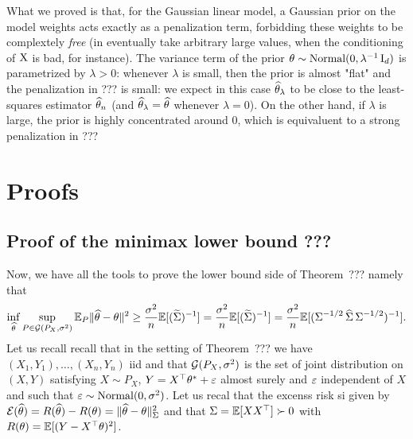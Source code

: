 What we proved is that, for the Gaussian linear model, a Gaussian prior on the model weights acts exactly as a penalization term, forbidding these weights to be complextely \emph{free} (in eventually take arbitrary large values, when the conditioning of $\operatorname{{\boldsymbol X}}$ is bad, for instance). The variance term of the prior $\theta \sim \operatorname{Normal}(0, \lambda^{-1} \operatorname{{\boldsymbol I}}_d)$ is parametrized by $\lambda > 0$: whenever $\lambda$ is small, then the prior is almost "flat" and the penalization in ??? is small: we expect in this case $\widehat \theta_\lambda$ to be close to the least-squares estimator $\widehat \theta_n$ (and $\widehat \theta_\lambda = \widehat \theta$ whenever $\lambda  = 0$). On the other hand, if $\lambda$ is large, the prior is highly concentrated around $0$, which is equivaluent to a strong penalization in ???


\section{Proofs} %
\label{sec:sec:chap05_proofs}


\subsection{Proof of the minimax lower bound ???} %
\label{sec:proof_of_the_minimax_lower_bound_}

Now, we have all the tools to prove the lower bound side of Theorem~??? namely that 
\begin{equation}
	\inf_{\widehat \theta} \sup_{P \in \operatorname{{\mathcal G}}(P_X, \sigma^2)} \mathbb E_P \| \widehat \theta - \theta \|^2 \geq \frac{\sigma^2}{n} \mathbb E [ (\widetilde {\operatorname{\boldsymbol \Sigma}})^{-1}] = \frac{\sigma^2}{n} \mathbb E [ (\widetilde {\operatorname{\boldsymbol \Sigma}})^{-1}] = \frac{\sigma^2}{n} \mathbb E [ (\operatorname{\boldsymbol \Sigma}^{-1/2} \widehat {\operatorname{\boldsymbol \Sigma}} \operatorname{\boldsymbol \Sigma}^{-1/2})^{-1}].
\end{equation}
Let us recall recall that in the setting of Theorem~??? we have $(X_1, Y_1), \ldots, (X_n, Y_n)$ iid and that $\operatorname{{\mathcal G}}(P_X, \sigma^2)$ is the set of joint distribution on $(X, Y)$ satisfying $X \sim P_X$, $Y = X^\top \theta^* + \varepsilon$ almost surely and $\varepsilon$ independent of $X$ and such that $\varepsilon \sim \operatorname{Normal}(0, \sigma^2)$.
Let us recal that the excenss risk si given by $\operatorname{{\mathcal E}}(\widehat \theta) = R(\widehat \theta) - R(\theta) = \| \widehat \theta - \theta \|_{\operatorname{\boldsymbol \Sigma}}^2$ and that $\operatorname{\boldsymbol \Sigma} = \mathbb E[X X^\top] \succ 0$ with $R(\theta) = \mathbb E[(Y - X^\top \theta)^2]$.

